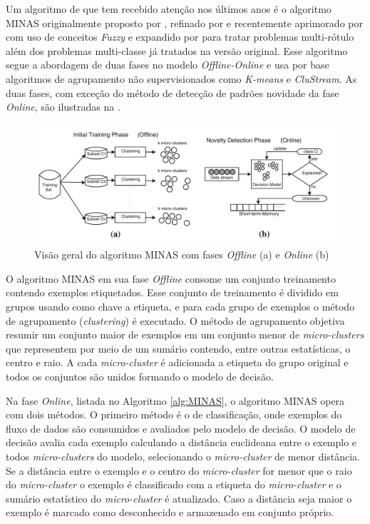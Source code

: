 Um algoritmo de \nd que tem recebido atenção nos últimos anos é o algoritmo
MINAS originalmente proposto por , refinado por
 e recentemente aprimorado por
 com uso de conceitos \emph{Fuzzy} e expandido por
 para tratar problemas multi-rótulo além dos problemas
multi-classe já tratados na versão original.
Esse algoritmo segue a abordagem de duas fases no modelo \emph{Offline-Online} e
usa por base algoritmos de agrupamento não supervisionados como \emph{K-means} e
\emph{CluStream}.
As duas fases, com exceção do método de detecção de padrões novidade da fase
\emph{Online}, são ilustradas na .

\begin{figure}[ht]
\centering
\includegraphics[width=1\textwidth]{figuras/FariaMinas2015-fases.png}
\caption{Visão geral do algoritmo MINAS com fases \emph{Offline} (a) e 
\emph{Online} (b) \cite{Faria2016minas}}
\label{fig:minas}
\end{figure}

\newcommand{\mcluster}{\emph{micro-cluster}\xspace}
\newcommand{\mclusters}{\emph{micro-clusters}\xspace}


O algoritmo MINAS em sua fase \emph{Offline} consome um conjunto treinamento
contendo exemplos etiquetados.
Esse conjunto de treinamento é dividido em grupos usando como chave a etiqueta,
e para cada grupo de exemplos o método de agrupamento (\emph{clustering}) é executado.
O método de agrupamento objetiva resumir um conjunto maior de exemplos em 
um conjunto menor de \mclusters que representem por meio de um sumário
contendo, entre outras estatísticas, o centro e raio.
A cada \mcluster é adicionada a etiqueta do grupo original e todos
os conjuntos são unidos formando o modelo de decisão.

Na fase \emph{Online}, listada no Algoritmo \ref{alg:MINAS}, o algoritmo MINAS
opera com dois métodos.
O primeiro método é o de classificação, onde exemplos do fluxo de dados
são consumidos e avaliados pelo modelo de decisão.
O modelo de decisão avalia cada exemplo calculando a distância euclideana
entre o exemplo e todos \mclusters do modelo, selecionando o
\mcluster de menor distância.
Se a distância entre o exemplo e o centro do \mcluster for menor que
o raio do \mcluster o exemplo é classificado com a etiqueta do \mcluster
e o sumário estatístico do \mcluster é atualizado.
Caso a distância seja maior o exemplo é marcado como desconhecido e armazenado
em conjunto próprio.

